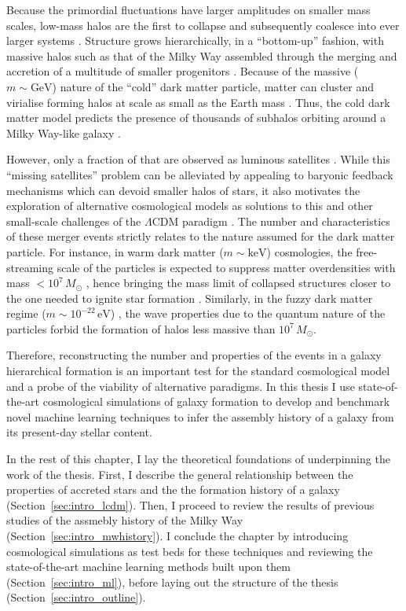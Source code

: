 Because the primordial fluctuations have larger amplitudes on smaller mass scales, low-mass halos are the first to collapse
and subsequently coalesce into ever larger systems \citep{Smith2003}. Structure grows hierarchically, in a ``bottom-up'' fashion,
with massive halos such as that of the Milky Way assembled through the merging and accretion 
of a multitude of smaller progenitors \citep{White1978,Searle1978}. Because of the massive ($m \sim  \text{GeV}$) nature of the ``cold'' dark matter particle, 
matter can cluster and virialise forming halos at scale as small as the Earth mass \citep{Diemand2005}. 
Thus, the cold dark matter model predicts the presence of thousands of subhalos orbiting around a Milky Way-like galaxy \citep{Springel2008}.

However, only a fraction of that are observed as luminous satellites \citep{McConnachie2012}. While
this ``missing satellites'' problem can be alleviated by appealing to baryonic feedback mechanisms which can devoid 
smaller halos of stars, it also motivates the exploration of alternative cosmological models as solutions to this
and other small-scale challenges of the $\Lambda\text{CDM}$ paradigm \citep{Bullock2017}.
The number and characteristics of these merger events strictly relates to the nature assumed 
for the dark matter particle. For instance, in warm dark matter ($m \sim  \text{keV}$) cosmologies, 
the free-streaming scale of the particles is expected to suppress matter overdensities with mass $<10^{7} \, M_{\odot}$ \citep{Bode2001}, 
hence bringing the mass limit of collapsed structures closer to the one needed to ignite star formation \citep{Jethwa2018}. 
Similarly, in the fuzzy dark matter regime ($m \sim  10^{-22} \,\text{eV}$) \citep{Hu2000}, 
the wave properties due to the quantum nature of the particles forbid the formation of halos
less massive than $10^{7} \, M_{\odot}$. 

Therefore, reconstructing the number and properties of the events 
in a galaxy hierarchical formation is an important test for the standard cosmological model and a
probe of the viability of alternative paradigms. In this thesis I use state-of-the-art cosmological
simulations of galaxy formation to develop and benchmark novel machine learning techniques to infer 
the assembly history of a galaxy from its present-day stellar content.


In the rest of this chapter, I lay the theoretical foundations of underpinning the work of the thesis. 
First, I describe the general relationship between the properties of accreted stars and the
the formation history of a galaxy (Section~\ref{sec:intro_lcdm}). Then, I proceed to review the results of
previous studies of the assmebly history of the Milky Way (Section~\ref{sec:intro_mwhistory}). I conclude the chapter by
introducing cosmological simulations as test beds for these techniques and reviewing the state-of-the-art
machine learning methods built upon them (Section~\ref{sec:intro_ml}), before laying out the structure of
the thesis (Section~\ref{sec:intro_outline}).


